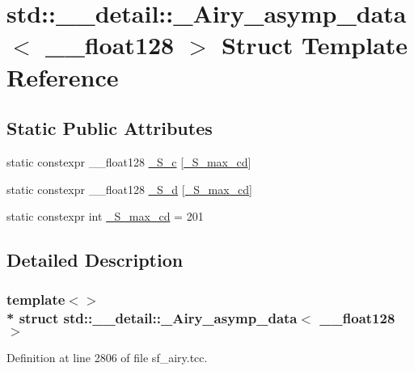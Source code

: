 \hypertarget{structstd_1_1____detail_1_1__Airy__asymp__data_3_01____float128_01_4}{}\section{std\+:\+:\+\_\+\+\_\+detail\+:\+:\+\_\+\+Airy\+\_\+asymp\+\_\+data$<$ \+\_\+\+\_\+float128 $>$ Struct Template Reference}
\label{structstd_1_1____detail_1_1__Airy__asymp__data_3_01____float128_01_4}
\subsection*{Static Public Attributes}
\begin{DoxyCompactItemize}
\item 
static constexpr \+\_\+\+\_\+float128 \hyperlink{structstd_1_1____detail_1_1__Airy__asymp__data_3_01____float128_01_4_a51445c01dfc26848f599fd45c165dbb9}{\+\_\+\+S\+\_\+c} \mbox{[}\hyperlink{structstd_1_1____detail_1_1__Airy__asymp__data_3_01____float128_01_4_abef02f6e320c7e0740d90c0dab1ba071}{\+\_\+\+S\+\_\+max\+\_\+cd}\mbox{]}
\item 
static constexpr \+\_\+\+\_\+float128 \hyperlink{structstd_1_1____detail_1_1__Airy__asymp__data_3_01____float128_01_4_af80f0e2bc09abc80d80e428ab6598dd5}{\+\_\+\+S\+\_\+d} \mbox{[}\hyperlink{structstd_1_1____detail_1_1__Airy__asymp__data_3_01____float128_01_4_abef02f6e320c7e0740d90c0dab1ba071}{\+\_\+\+S\+\_\+max\+\_\+cd}\mbox{]}
\item 
static constexpr int \hyperlink{structstd_1_1____detail_1_1__Airy__asymp__data_3_01____float128_01_4_abef02f6e320c7e0740d90c0dab1ba071}{\+\_\+\+S\+\_\+max\+\_\+cd} = 201
\end{DoxyCompactItemize}


\subsection{Detailed Description}
\subsubsection*{template$<$$>$\\*
struct std\+::\+\_\+\+\_\+detail\+::\+\_\+\+Airy\+\_\+asymp\+\_\+data$<$ \+\_\+\+\_\+float128 $>$}



Definition at line 2806 of file sf\+\_\+airy.\+tcc.



